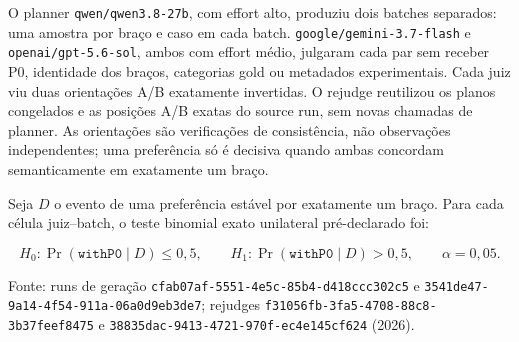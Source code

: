 \documentclass[12pt,a4paper]{article}
\begin{document}
O planner \nolinkurl{qwen/qwen3.8-27b}, com effort alto, produziu dois batches separados: uma amostra por braço e caso em cada batch. \nolinkurl{google/gemini-3.7-flash} e \nolinkurl{openai/gpt-5.6-sol}, ambos com effort médio, julgaram cada par sem receber P0, identidade dos braços, categorias gold ou metadados experimentais. Cada juiz viu duas orientações A/B exatamente invertidas. O rejudge reutilizou os planos congelados e as posições A/B exatas do source run, sem novas chamadas de planner. As orientações são verificações de consistência, não observações independentes; uma preferência só é decisiva quando ambas concordam semanticamente em exatamente um braço.

Seja \(D\) o evento de uma preferência estável por exatamente um braço. Para cada célula juiz--batch, o teste binomial exato unilateral pré-declarado foi:

\begin{equation}
H_0: \Pr(\texttt{withP0}\mid D) \leq 0{,}5,
\qquad
H_1: \Pr(\texttt{withP0}\mid D) > 0{,}5,
\qquad \alpha = 0{,}05.
\end{equation}

\begin{table}[H]
\centering
\caption*{\textbf{Quadro 14 - Preferência cega na ablação com bundle oráculo}}
\scriptsize
\renewcommand{\arraystretch}{1.12}
\par\smallskip\raggedright\small Fonte: runs de geração \texttt{cfab07af-5551-4e5c-85b4-d418ccc302c5} e \texttt{3541de47-9a14-4f54-911a-06a0d9eb3de7}; rejudges \texttt{f31056fb-3fa5-4708-88c8-3b37feef8475} e \texttt{38835dac-9413-4721-970f-ec4e145cf624} (2026).
\end{table}
\end{document}

